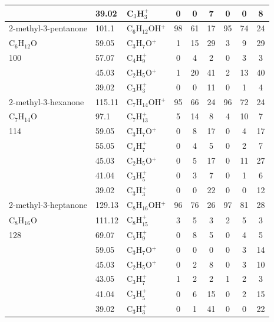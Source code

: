 {\begin{longtable}[c]{lllcccccc}
 & 39.02 & C$_3$H$_{3}^+$ & 0 & 0 & 7 & 0 & 0 & 8 \\ \hline
2-methyl-3-pentanone & 101.1 & C$_6$H$_{12}$OH$^+$ & 98 & 61 & 17 & 95 & 74 & 24 \\
C$_6$H$_{12}$O & 59.05 & C$_3$H$_{7}$O$^+$ & 1 & 15 & 29 & 3 & 9 & 29 \\
100 & 57.07 & C$_4$H$_{9}^+$ & 0 & 4 & 2 & 0 & 3 & 3 \\
 & 45.03 & C$_2$H$_{5}$O$^+$ & 1 & 20 & 41 & 2 & 13 & 40 \\
 & 39.02 & C$_3$H$_{3}^+$ & 0 & 0 & 11 & 0 & 1 & 4 \\ \hline
2-methyl-3-hexanone & 115.11 & C$_7$H$_{14}$OH$^+$ & 95 & 66 & 24 & 96 & 72 & 24 \\
C$_7$H$_{14}$O & 97.1 & C$_7$H$_{13}^+$ & 5 & 14 & 8 & 4 & 10 & 7 \\
114 & 59.05 & C$_3$H$_{7}$O$^+$ & 0 & 8 & 17 & 0 & 4 & 17 \\
 & 55.05 & C$_4$H$_{7}^+$ & 0 & 4 & 5 & 0 & 2 & 7 \\
 & 45.03 & C$_2$H$_{5}$O$^+$ & 0 & 5 & 17 & 0 & 11 & 27 \\
 & 41.04 & C$_3$H$_{5}^+$ & 0 & 3 & 7 & 0 & 1 & 6 \\
 & 39.02 & C$_3$H$_{3}^+$ & 0 & 0 & 22 & 0 & 0 & 12 \\ \hline
2-methyl-3-heptanone & 129.13 & C$_8$H$_{16}$OH$^+$ & 96 & 76 & 26 & 97 & 81 & 28 \\
C$_8$H$_{16}$O & 111.12 & C$_8$H$_{15}^+$ & 3 & 5 & 3 & 2 & 5 & 3 \\
128 & 69.07 & C$_5$H$_{9}^+$ & 0 & 8 & 5 & 0 & 4 & 5 \\
 & 59.05 & C$_3$H$_{7}$O$^+$ & 0 & 0 & 0 & 0 & 3 & 14 \\
 & 45.03 & C$_2$H$_{5}$O$^+$ & 0 & 2 & 8 & 0 & 3 & 10 \\
 & 43.05 & C$_3$H$_{7}^+$ & 1 & 2 & 2 & 1 & 2 & 3 \\
 & 41.04 & C$_3$H$_{5}^+$ & 0 & 6 & 15 & 0 & 2 & 15 \\
 & 39.02 & C$_3$H$_{3}^+$ & 0 & 1 & 41 & 0 & 0 & 22\\ \hline
\end{longtable}
}%


